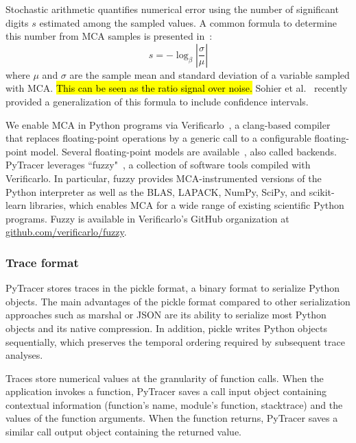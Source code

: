 \documentclass[10pt,journal,compsoc]{IEEEtran}
\newcommand{\pytracer}[0]{PyTracer\xspace}
\DeclareRobustCommand{\add}[1]{\sethlcolor{lightgreen}\hl{#1}}
\begin{document}
Stochastic arithmetic quantifies numerical error using the number of significant
digits $s$ estimated among the sampled values. A common formula to determine
this number from MCA samples is presented in~\cite{parker1997monte}:
\begin{equation}
    s = -\log_{\beta}{ \left| \dfrac{\sigma}{\mu} \right|} \label{eq:sig-digits}
\end{equation}
where $\mu$ and $\sigma$ are the sample mean and standard deviation of a
variable sampled with MCA. \add{This can be seen as the ratio signal over noise.}
Sohier et al.~\cite{sohier2021confidence} recently provided a generalization of
this formula to include confidence intervals.

We enable MCA in Python programs via Verificarlo~\cite{verificarlo}, a
clang-based compiler~\cite{lattner2008llvm} that replaces floating-point
operations by a generic call to a configurable floating-point model. Several
floating-point models are
available~\cite{chatelain2019automatic,chatelain2019outils}, also called
backends. \pytracer leverages ``fuzzy"~\cite{kiar2020comparing}, a collection of
software tools compiled with Verificarlo. In particular, fuzzy provides
MCA-instrumented versions of the Python interpreter as well as the BLAS, LAPACK,
NumPy, SciPy, and scikit-learn libraries, which enables MCA for a wide range of
existing scientific Python programs. Fuzzy is available in Verificarlo's GitHub
organization at
\href{https://github.com/verificarlo/fuzzy}{\url{github.com/verificarlo/fuzzy}}.

\subsubsection{Trace format}

\pytracer stores traces in the pickle format, a binary format to serialize
Python objects. The main advantages of the pickle format compared to other
serialization approaches such as marshal or JSON are its ability to serialize
most Python objects and its native compression.  In addition, pickle writes
Python objects sequentially, which preserves the temporal ordering required by
subsequent trace analyses.

Traces store numerical values at the granularity of function calls. When the
application invokes a function, \pytracer saves a call input object containing
contextual information (function's name, module's function, stacktrace) and the
values of the function arguments. When the function returns, \pytracer saves a
similar call output object containing the returned value. 
\end{document}
